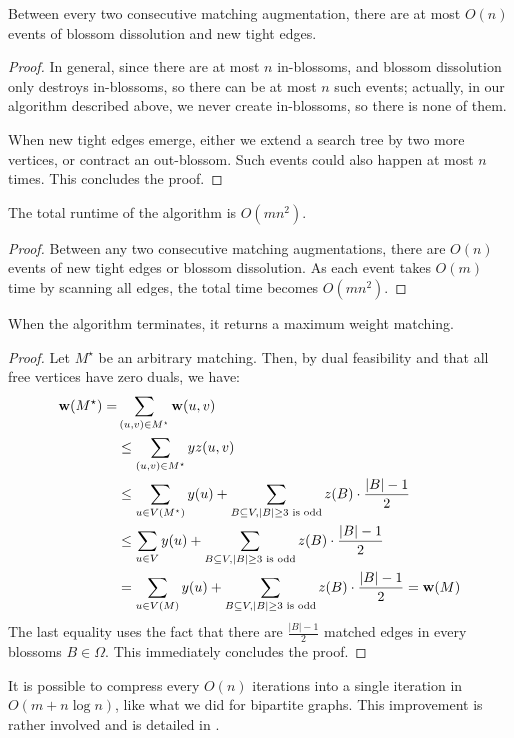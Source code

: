 \begin{lemma}
	Between every two consecutive matching augmentation, there are at most $O(n)$ events of blossom dissolution and new tight edges.
\end{lemma}
\begin{proof}
	In general, since there are at most $n$ in-blossoms, and blossom dissolution only destroys in-blossoms, so there can be at most $n$ such events; actually, in our algorithm described above, we never create in-blossoms, so there is none of them.
	
	When new tight edges emerge, either we extend a search tree by two more vertices, or contract an out-blossom. Such events could also happen at most $n$ times. This concludes the proof.
\end{proof}

\begin{corollary}
	The total runtime of the algorithm is $O(mn^2)$.
\end{corollary}
\begin{proof}
	Between any two consecutive matching augmentations, there are $O(n)$ events of new tight edges or blossom dissolution. As each event takes $O(m)$ time by scanning all edges, the total time becomes $O(mn^2)$.
\end{proof}

\begin{lemma}
	When the algorithm terminates, it returns a maximum weight matching.
\end{lemma}
\begin{proof}
	Let $M^\star$ be an arbitrary matching. Then, by dual feasibility and that all free vertices have zero duals, we have:
	$$\begin{aligned}
		\mathbf{w}(M^\star) = &\sum_{(u, v)\in M^\star} \mathbf{w}(u, v)\\
		&\leq \sum_{(u, v)\in M^\star} yz(u, v)\\
		&\leq \sum_{u\in V(M^\star)}y(u) + \sum_{B\subseteq V, |B|\geq 3 \text{ is odd}}z(B)\cdot \frac{|B|-1}{2}\\
		&\leq \sum_{u\in V}y(u) + \sum_{B\subseteq V, |B|\geq 3 \text{ is odd}}z(B)\cdot \frac{|B|-1}{2}\\
		&= \sum_{u\in V(M)}y(u) + \sum_{B\subseteq V, |B|\geq 3 \text{ is odd}}z(B)\cdot \frac{|B|-1}{2} = \mathbf{w}(M)
	\end{aligned}$$
	The last equality uses the fact that there are $\frac{|B|-1}{2}$ matched edges in every blossoms $B\in \Omega$. This immediately concludes the proof.
\end{proof}

\begin{remark}
	It is possible to compress every $O(n)$ iterations into a single iteration in $O(m + n\log n)$, like what we did for bipartite graphs. This improvement is rather involved and is detailed in \cite{gabow2018data}.
\end{remark}